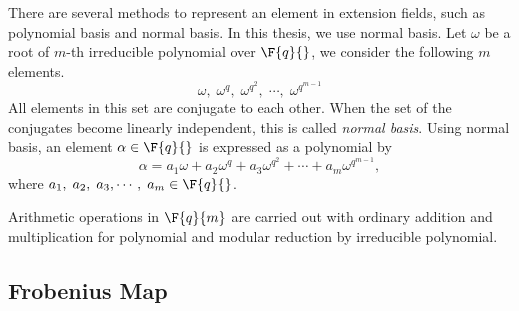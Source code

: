 
There are several methods to represent an element in extension fields, such as polynomial basis and normal basis.
In this thesis, we use normal basis.
Let $\omega$ be a root of $m$-th irreducible polynomial over $\F{q}{}$, we consider the following $m$ elements.
\begin{equation}
\omega,\;\omega^q,\;\omega^{q^2},\;\cdots,\;\omega^{q^{m-1}} \nonumber
\end{equation}
All elements in this set are conjugate to each other.
When the set of the conjugates become linearly independent, this is called {\it normal basis}.
Using normal basis, an element $\alpha \in \F{q}{}$ is expressed as a polynomial by  
\begin{equation}
\alpha = a_1 \omega + a_2 \omega^q + a_3 \omega^{q^2} + \cdots + a_m \omega^{q^{m-1}}, 
\end{equation}
where $a_1,\;a_2,\;a_3,\cdots,\;a_m \in \F{q}{}$.

Arithmetic operations in $\F{q}{m}$ are carried out with ordinary addition and multiplication for polynomial and modular reduction by irreducible polynomial.





\subsection{Frobenius Map}\label{sec:chap:fund:frobeniusmap}


